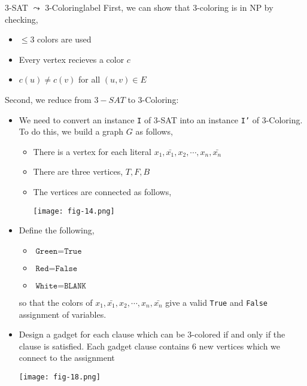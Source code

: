  	\begin{ex}{3-SAT $\leadsto$ 3-Coloring}{label}
 		First, we can show that 3-coloring is in NP by checking,
 		\begin{itemize}
 			\item $\leq 3$ colors are used
 			\item Every vertex recieves a color $c$
 			\item $c(u) \neq c(v)$ for all $(u,v) \in E$
 		\end{itemize}
 		
 		Second, we reduce from $3-SAT$ to 3-Coloring:
 		\begin{itemize}
 			\item We need to convert an instance \texttt{I} of 3-SAT into an instance \texttt{I'} of 3-Coloring. To do this, we build a graph $G$ as follows,
 			\begin{itemize}
 				\item There is a vertex for each literal $x_1, \bar{x_1}, x_2, \cdots, x_n, \bar{x_n}$
 				\item There are three vertices, $T, F, B$
 				\item The vertices are connected as follows,
 					\begin{center}
 						\texttt{[image: fig-14.png]}
 					\end{center}
 			\end{itemize}
 			\item Define the following,
 				\begin{itemize}
 					\item $\texttt{Green} = \texttt{True}$
 					\item $\texttt{Red} = \texttt{False}$
 					\item $\texttt{White} = \texttt{BLANK}$
 				\end{itemize}
 			\noindent so that the colors of $x_1, \bar{x_1}, x_2, \cdots, x_n, \bar{x_n}$ give a valid \texttt{True} and \texttt{False} assignment of variables.
 			
 			\item Design a gadget for each clause which can be 3-colored if and only if the clause is satisfied. Each gadget clause contains 6 new vertices which we connect to the assignment
 			 \begin{center}
 						\texttt{[image: fig-18.png]}
 			\end{center}


\end{itemize}
\end{ex}
